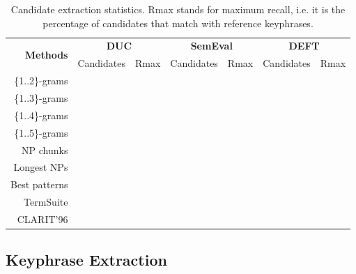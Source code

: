     \begin{table}[h]
      \centering
      \begin{tabular}{rcccccc}
        \toprule
        \multirow{2}{*}[-2pt]{\textbf{Methods}} & \multicolumn{2}{c}{\textbf{DUC}} & \multicolumn{2}{c}{\textbf{SemEval}} & \multicolumn{2}{c}{\textbf{DEFT}}\\
        \cmidrule(r){2-3}\cmidrule(lr){4-5}\cmidrule(l){6-7}
        & Candidates & Rmax & Candidates & Rmax & Candidates & Rmax\\
        \midrule
        \{1..2\}-grams\\
        \{1..3\}-grams\\
        \{1..4\}-grams\\
        \{1..5\}-grams\\
        NP chunks\\
        Longest NPs\\
        Best patterns\\
        TermSuite\\
        CLARIT'96\\
        \bottomrule
      \end{tabular}
      \caption{Candidate extraction statistics. Rmax stands for maximum recall,
               i.e. it is the percentage of candidates that match with reference
               keyphrases. \label{tab:candidate_extraction_statistics}}
    \end{table}


  \subsection{Keyphrase Extraction}
  \label{subsec:keyphrase_extraction}

